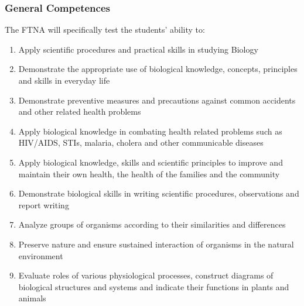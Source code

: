 \subsubsection{General Competences}
\noindent The FTNA will specifically test the students' ability to:
\begin{enumerate}[topsep=1ex,itemsep=0ex,partopsep=1ex,parsep=1ex]
	\item Apply scientific procedures and practical skills in studying Biology
	\item Demonstrate the appropriate use of biological knowledge, concepts, principles and skills in everyday life
	\item Demonstrate preventive measures and precautions against common accidents and other related health problems
	\item Apply biological knowledge in combating health related problems such as HIV/AIDS, STIs, malaria, cholera and other communicable diseases
	\item Apply biological knowledge, skills and scientific principles to improve and maintain their own health, the health of the families and the community
	\item Demonstrate biological skills in writing scientific procedures, observations and report writing
	\item Analyze groups of organisms according to their similarities and differences
	\item Preserve nature and ensure sustained interaction of organisms in the natural environment
	\item Evaluate roles of various physiological processes, construct diagrams of biological structures and systems and indicate their functions in plants and animals
\end{enumerate}

